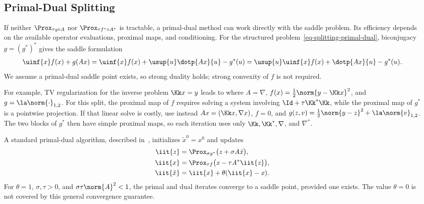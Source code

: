 \subsection{Primal-Dual Splitting}

If neither $\Prox_{\tau g \circ A}$ nor $\Prox_{\tau f^\star\circ A^*}$ is tractable, a primal-dual method can work directly with the saddle problem. Its efficiency depends on the available operator evaluations, proximal maps, and conditioning.
%
For the structured problem~\eqref{eq-splitting-primal-dual}, biconjugacy $g=(g^*)^*$ gives the saddle formulation
\begin{align}\label{eq-splitting-primal-dual-bis}
	\uinf{x} f(x) + g(Ax) = \uinf{x} f(x) + \usup{u} \dotp{Ax}{u} - g^*(u)
	= \usup{u} \uinf{x} f(x) + \dotp{Ax}{u}  - g^*(u).
\end{align}
We assume a primal-dual saddle point exists, so strong duality holds; strong convexity of $f$ is not required.

\begin{exmp}
For example, TV regularization for the inverse problem $\Kk x=y$ leads to
where $A=\nabla$, $f(x)=\frac{1}{2}\norm{y-\Kk x}^2$, and $g=\la \norm{\cdot}_{1,2}$.
%
For this split, the proximal map of $f$ requires solving a system involving $\Id+\tau\Kk^*\Kk$, while the proximal map of $g^*$ is a pointwise projection. If that linear solve is costly, use instead $A x=(\Kk x,\nabla x)$, $f=0$, and $g(z,v)=\frac12\norm{y-z}^2+\la\norm{v}_{1,2}$. The two blocks of $g^*$ then have simple proximal maps, so each iteration uses only $\Kk,\Kk^*,\nabla$, and $\nabla^*$.
\end{exmp}

A standard primal-dual algorithm, described in~\cite{chambolle2016introduction}, initializes $\tilde x^0=x^0$ and updates
\begin{align*}
 \iit{z}&=\Prox_{\sigma g^*}\bigl(\it{z}+\sigma A\it{\tilde x}\bigr),\\
 \iit{x}&=\Prox_{\tau f}\bigl(\it{x}-\tau A^*\iit{z}\bigr),\\
 \iit{\tilde x}&=\iit{x}+\theta(\iit{x}-\it{x}).
\end{align*}
For $\theta=1$, $\sigma,\tau>0$, and $\sigma\tau\norm{A}^2<1$, the primal and dual iterates converge to a saddle point, provided one exists. The value $\theta=0$ is not covered by this general convergence guarantee.
